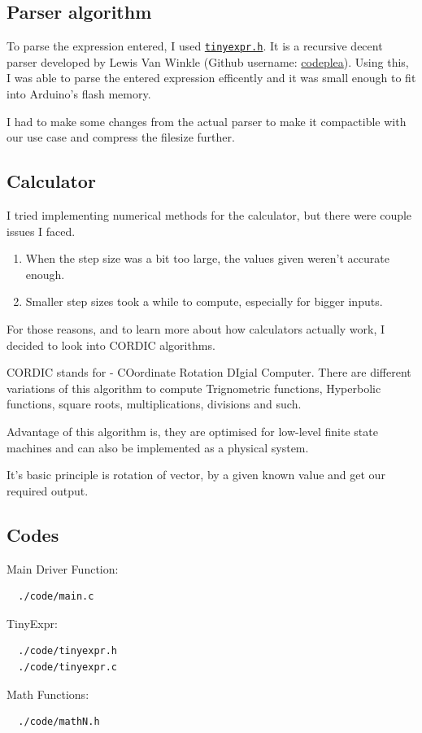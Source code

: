 \documentclass[journal]{IEEEtran}
\begin{document}
\subsection{Parser algorithm}

To parse the expression entered, I used \href{https://github.com/codeplea/tinyexpr}{\texttt{tinyexpr.h}}. It is a recursive decent parser developed by Lewis Van Winkle (Github username: \href{https://github.com/codeplea}{codeplea}). Using this, I was able to parse the entered expression efficently and it was small enough to fit into Arduino's flash memory. 

I had to make some changes from the actual parser to make it compactible with our use case and compress the filesize further.

\subsection{Calculator}

I tried implementing numerical methods for the calculator, but there were couple issues I faced.

\begin{enumerate}
  \item When the step size was a bit too large, the values given weren't accurate enough.
  \item Smaller step sizes took a while to compute, especially for bigger inputs.
\end{enumerate}

For those reasons, and to learn more about how calculators actually work, I decided to look into CORDIC algorithms. 

CORDIC stands for - COordinate Rotation DIgial Computer. There are different variations of this algorithm to compute Trignometric functions, Hyperbolic functions, square roots, multiplications, divisions and such. 

Advantage of this algorithm is, they are optimised for low-level finite state machines and can also be implemented as a physical system. 

It's basic principle is rotation of vector, by a given known value and get our required output. 

% 
\subsection{Codes}

Main Driver Function:
\begin{lstlisting}
  ./code/main.c
\end{lstlisting}

TinyExpr:
\begin{lstlisting}
  ./code/tinyexpr.h
  ./code/tinyexpr.c
\end{lstlisting}

Math Functions:
\begin{lstlisting}
  ./code/mathN.h
\end{lstlisting}
\end{document}

